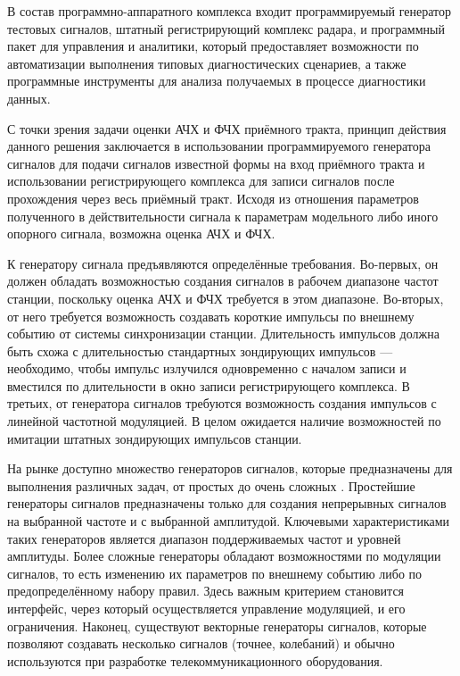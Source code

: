 \documentclass{report}
\begin{document}
В состав программно-аппаратного комплекса входит программируемый генератор тестовых сигналов, штатный регистрирующий комплекс радара, и программный пакет для управления и аналитики, который предоставляет возможности по автоматизации выполнения типовых диагностических сценариев, а также программные инструменты для анализа получаемых в процессе диагностики данных.

С точки зрения задачи оценки АЧХ и ФЧХ приёмного тракта, принцип действия данного решения заключается в использовании программируемого генератора сигналов для подачи сигналов известной формы на вход приёмного тракта и использовании регистрирующего комплекса для записи сигналов после прохождения через весь приёмный тракт. Исходя из отношения параметров полученного в действительности сигнала к параметрам модельного либо иного опорного сигнала, возможна оценка АЧХ и ФЧХ.

К генератору сигнала предъявляются определённые требования. Во-первых, он должен обладать возможностью создания сигналов в рабочем диапазоне частот станции, поскольку оценка АЧХ и ФЧХ требуется в этом диапазоне. Во-вторых, от него требуется возможность создавать короткие импульсы по внешнему событию от системы синхронизации станции. Длительность импульсов должна быть схожа с длительностью стандартных зондирующих импульсов --- необходимо, чтобы импульс излучился одновременно с началом записи и вместился по длительности в окно записи регистрирующего комплекса. В третьих, от генератора сигналов требуются возможность создания импульсов с линейной частотной модуляцией. В целом ожидается наличие возможностей по имитации штатных зондирующих импульсов станции.


На рынке доступно множество генераторов сигналов, которые предназначены для выполнения различных задач, от простых до очень сложных \cite{siggen1}. Простейшие генераторы сигналов предназначены только для создания непрерывных сигналов на выбранной частоте и с выбранной амплитудой. Ключевыми характеристиками таких генераторов является диапазон поддерживаемых частот и уровней амплитуды. Более сложные генераторы обладают возможностями по модуляции сигналов, то есть изменению их параметров по внешнему событию либо по предопределённому набору правил. Здесь важным критерием становится интерфейс, через который осуществляется управление модуляцией, и его ограничения. Наконец, существуют векторные генераторы сигналов, которые позволяют создавать несколько сигналов (точнее, колебаний) и обычно используются при разработке телекоммуникационного оборудования.
\end{document}
